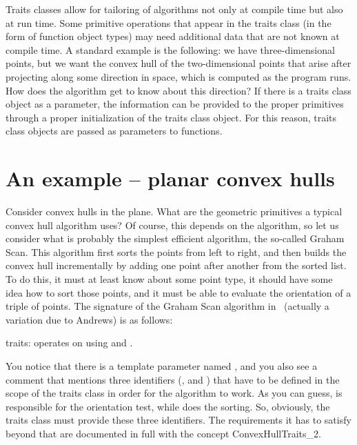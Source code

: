 Traits classes allow for tailoring of algorithms not only at compile time
but also at run time.  Some primitive operations that appear in the traits
class (in the form of function object types) may need additional data that
are not known at compile time.  A standard example is the following: we have
three-dimensional points, but we want the convex hull of the two-dimensional 
points that arise after projecting along some direction in space, which is
computed as the program runs. How does the algorithm get to know about this 
direction? If there is a traits class object as a parameter, the 
information can be provided to the proper primitives through a proper 
initialization of the traits class object.
For this reason, traits class objects are passed
as parameters to functions. 

\section{An example -- planar convex hulls}
\label{sec:traits_class_example}

Consider convex hulls in the plane. What are the geometric primitives a 
typical 
convex hull algorithm uses? Of course, this depends on the algorithm, so
let us consider what is probably the simplest efficient algorithm, the 
so-called Graham Scan. This algorithm first sorts the points from left to right,
and then builds the convex hull incrementally by adding one point after
another from the sorted list. To do this, it must at least know about 
some point type, it should have some idea how to sort those points, and
it must be able to evaluate the orientation of a triple of points. The
signature of the Graham Scan algorithm in \cgal\ (actually a variation 
due to Andrews) is as follows:

\ccAutoIndexingOff
{}
           {{\sc traits}: operates on  using
             and 
            .
           }
\ccAutoIndexingOn

You notice that there is a template parameter named , 
and you also see a comment that mentions three identifiers (, 
 and ) that have to be defined in the
scope of the traits class in order for the algorithm to work.
As you can guess,  is responsible for the orientation 
test, while  does the sorting. So, obviously, the traits class
must provide these three identifiers. The requirements it has to satisfy
beyond that are documented in full with the concept ConvexHullTraits\_2.

